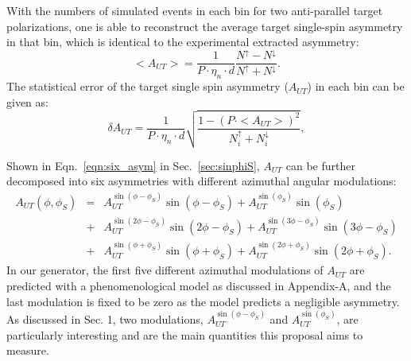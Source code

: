 With the numbers of simulated events in each bin for two anti-parallel target
polarizations, one is able to reconstruct the average target single-spin
asymmetry in that bin, which is identical to the experimental extracted
asymmetry:
\begin{equation}
   <A_{UT}> = \frac{1}{P\cdot\eta_{n}\cdot d}
   \frac{N^{\uparrow}-N^{\downarrow}}{N^{\uparrow}+N^{\downarrow}}.
   \label{asym_exp}
\end{equation}
The statistical error of the target single spin asymmetry ($A_{UT}$) in each
bin can be given as:
  \begin{equation}
    \delta A_{UT} = \frac{1}{P\cdot\eta_{n}\cdot d} \sqrt{\frac{1-(P\cdot
        <A_{UT}>)^{2}}{N^{\uparrow}_{i}+N^{\downarrow}_{i}}},
    \label{stat_err}
 \end{equation}
 

Shown in Eqn.~\ref{eqn:six_asym} in Sec.~\ref{sec:sinphiS}, $A_{UT}$ can be
further decomposed into six asymmetries with different azimuthal angular
modulations:
   \begin{eqnarray}
        A_{UT}(\phi, \phi_{S}) &=& A_{UT}^{\sin(\phi-\phi_{S})}
        \sin(\phi-\phi_{S})+ A_{UT}^{\sin(\phi_{S})} \sin(\phi_{S}) \nonumber \\
       &+& A_{UT}^{\sin(2\phi-\phi_{S})} \sin(2\phi-\phi_{S})+
        A_{UT}^{\sin(3\phi-\phi_{S})} \sin(3\phi-\phi_{S}) \nonumber \\
      &+& A_{UT}^{\sin(\phi+\phi_{S})}
        \sin(\phi+\phi_{S})+A_{UT}^{\sin(2\phi+\phi_{S})} \sin(2\phi+\phi_{S}).
   \end{eqnarray}
In our generator, the first five different azimuthal modulations of $A_{UT}$
are predicted with a phenomenological model as discussed in Appendix-A, and the
last modulation is fixed to be zero as the model predicts a negligible
asymmetry.  As discussed in Sec. 1, two modulations,
$A_{UT}^{\sin(\phi-\phi_{S})} $ and $A_{UT}^{\sin(\phi_{S})}$, are particularly
interesting and are the main quantities this proposal aims to measure.

